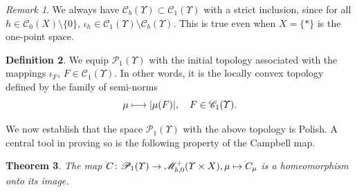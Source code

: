 \documentclass[JEP,XML,SOM,Unicode,published]{cedram}
\newcommand\mto{\mathchoice{\longmapsto}{\mapsto}{\mapsto}{\mapsto}}
\newtheorem{theorem}{Theorem}[section]
\theoremstyle{definition}
\newtheorem{definition}[theorem]{Definition}
\theoremstyle{remark}
\newtheorem{remark}[theorem]{Remark}
\DeclarePairedDelimiter{\abs}{\lvert}{\rvert}
\begin{document}
\begin{remark}
We always have $\mathscr{C}_{b}(\varUpsilon) \subset \mathscr{C}_{1}(\varUpsilon)$ with a strict inclusion, since for all $h \in \mathscr{C}_{0}(X) \setminus \{0\}$, $\iota_{h} \in \mathscr{C}_{1}(\varUpsilon) \setminus \mathscr{C}_{b}(\varUpsilon)$.
This is true even when $X = \{*\}$ is the one-point space.
\end{remark}

\begin{definition}\label{d:P1}
We equip $\mathscr{P}_{1}(\varUpsilon)$ with the initial topology associated with the mappings $\iota_{F}$, $F \in \mathscr{C}_{1}(\varUpsilon)$.
In other words, it is the locally convex topology defined by the family of semi-norms
\begin{equation*}
\mu \mto \abs{\mu(F)}, \quad F \in \mathscr{C}_{1}(\varUpsilon).
\end{equation*}
\end{definition}

We now establish that the space $\mathscr{P}_{1}(\varUpsilon)$ with the above topology is Polish.
A central tool in proving so is the following property of the Campbell map.

\begin{theorem}\label{t:C-homeomorphism}
The map $C \colon \mathscr{P}_{1}(\varUpsilon) \to \mathscr{M}^{+}_{b,0}(\varUpsilon \times X), \mu \mto C_{\mu}$ is a homeomorphism onto its image.
\end{theorem}
\end{document}
